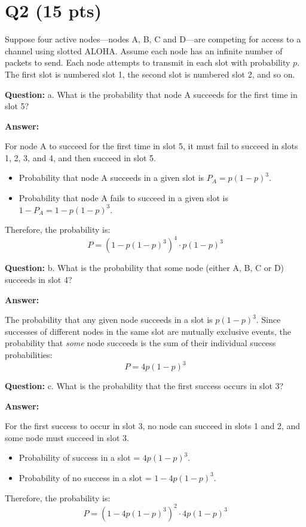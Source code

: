 \documentclass[12pt, letterpaper]{article}
\newcommand{\question}[1]{\noindent\textbf{Question: }#1\par\vspace{0.5em}}
\newcommand{\answer}{\noindent\textbf{Answer:}\par\vspace{0.5em}}
\begin{document}
\section*{Q2 (15 pts)}

Suppose four active nodes---nodes A, B, C and D---are competing for access to a channel using slotted ALOHA. Assume each node has an infinite number of packets to send. Each node attempts to transmit in each slot with probability $p$. The first slot is numbered slot 1, the second slot is numbered slot 2, and so on.

\question{a. What is the probability that node A succeeds for the first time in slot 5?}

\answer
For node A to succeed for the first time in slot 5, it must fail to succeed in slots 1, 2, 3, and 4, and then succeed in slot 5.
\begin{itemize}
    \item Probability that node A succeeds in a given slot is $P_A = p(1-p)^3$.
    \item Probability that node A fails to succeed in a given slot is $1 - P_A = 1 - p(1-p)^3$.
\end{itemize}
Therefore, the probability is:
\begin{equation*}
P = \left(1 - p(1-p)^3\right)^4 \cdot p(1-p)^3
\end{equation*}

\question{b. What is the probability that some node (either A, B, C or D) succeeds in slot 4?}

\answer
The probability that any given node succeeds in a slot is $p(1-p)^3$. Since successes of different nodes in the same slot are mutually exclusive events, the probability that \textit{some} node succeeds is the sum of their individual success probabilities:
\begin{equation*}
P = 4p(1-p)^3
\end{equation*}

\question{c. What is the probability that the first success occurs in slot 3?}

\answer
For the first success to occur in slot 3, no node can succeed in slots 1 and 2, and some node must succeed in slot 3.
\begin{itemize}
    \item Probability of success in a slot = $4p(1-p)^3$.
    \item Probability of no success in a slot = $1 - 4p(1-p)^3$.
\end{itemize}
Therefore, the probability is:
\begin{equation*}
P = \left(1 - 4p(1-p)^3\right)^2 \cdot 4p(1-p)^3
\end{equation*}
\end{document}
